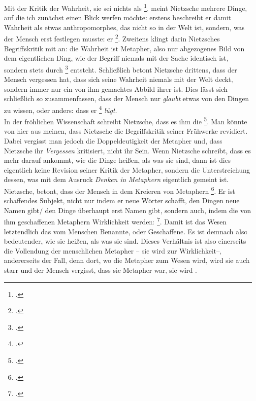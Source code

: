 \documentclass[12pt, a4paper, openany]{report}
\begin{document}
Mit der Kritik der Wahrheit, sie sei nichts als \footcite[][880]{nietzsche_geburt_1999}, meint Nietzsche mehrere Dinge, auf die ich zunächst einen Blick werfen möchte: 
erstens beschreibt er damit Wahrheit als etwas anthropomorphes, das nicht so in der Welt ist, sondern, was der Mensch erst festlegen musste: er \footcite[][877]{nietzsche_geburt_1999}.
Zweitens klingt darin Nietzsches Begriffskritik mit an:
die Wahrheit ist Metapher, also nur abgezogenes Bild von dem eigentlichen Ding, wie der Begriff niemals mit der Sache identisch ist, sondern stets durch \footcite[][880]{nietzsche_geburt_1999} entsteht.
Schließlich betont Nietzsche drittens, dass der Mensch vergessen hat, dass sich seine Wahrheit niemals mit der Welt deckt, sondern immer nur ein von ihm gemachtes Abbild ihrer ist. 
Dies lässt sich schließlich so zusammenfassen, dass der Mensch nur \emph{glaubt} etwas von den Dingen zu wissen, oder anders: dass er \footcite[][881]{nietzsche_geburt_1999} \emph{lügt}.\\

In der fröhlichen Wissenschaft schreibt Nietzsche, dass es ihm die \footcite[][§ 58. S. 422.]{nietzsche_morgenrote_1999}.
Man könnte von hier aus meinen, dass Nietzsche die Begriffskritik seiner Frühwerke revidiert. 
Dabei vergisst man jedoch die Doppeldeutigkeit der Metapher und, dass Nietzsche ihr \emph{Vergessen} kritisiert, nicht ihr Sein. 
Wenn Nietzsche schreibt, dass es mehr darauf ankommt, wie die Dinge heißen, als was sie sind, dann ist dies eigentlich keine Revision seiner Kritik der Metapher, sondern die Unterstreichung dessen, was mit dem Ausruck \emph{Denken in Metaphern} eigentlich gemeint ist.
Nietzsche, betont, dass der Mensch in dem Kreieren von Metaphern \footcite[][883]{nietzsche_geburt_1999}.
Er ist schaffendes Subjekt, nicht nur indem er neue Wörter schafft, den Dingen neue Namen gibt/ den Dinge überhaupt erst Namen gibt, sondern auch, indem die von ihm geschaffenen Metaphern Wirklichkeit werden: 
\footcite[][§ 58, S. 422]{nietzsche_morgenrote_1999}.
Damit ist das Wesen letztendlich das vom Menschen Benannte, oder Geschaffene.
Es ist demnach also bedeutender, wie sie heißen, als was sie sind.
Dieses Verhältnis ist also einerseits die Vollendung der menschlichen Metapher -- sie wird zur Wirklichkeit--, andererseits der Fall, denn dort, wo die Metapher zum Wesen wird, wird sie auch starr und der Mensch vergisst, dass sie Metapher war, sie wird .
\end{document}
